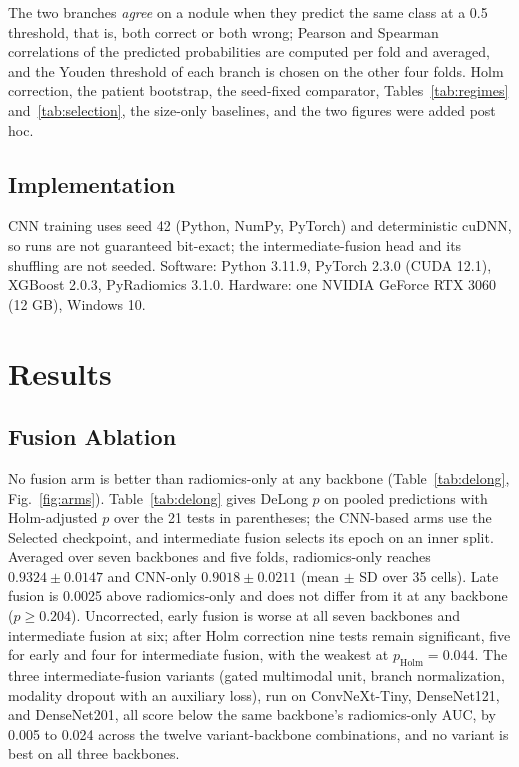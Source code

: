\documentclass[conference]{IEEEtran}
\begin{document}
The two branches \emph{agree} on a nodule when they predict the same class at a 0.5 threshold, that is, both correct or both wrong; Pearson and Spearman correlations of the predicted probabilities are computed per fold and averaged, and the Youden threshold of each branch is chosen on the other four folds. Holm correction, the patient bootstrap, the seed-fixed comparator, Tables~\ref{tab:regimes} and~\ref{tab:selection}, the size-only baselines, and the two figures were added post hoc.

\subsection{Implementation}\label{sec:impl}
CNN training uses seed 42 (Python, NumPy, PyTorch) and deterministic cuDNN, so runs are not guaranteed bit-exact; the intermediate-fusion head and its shuffling are not seeded. Software: Python 3.11.9, PyTorch 2.3.0 (CUDA 12.1), XGBoost 2.0.3, PyRadiomics 3.1.0. Hardware: one NVIDIA GeForce RTX 3060 (12 GB), Windows 10.

\section{Results}\label{sec:results}

\subsection{Fusion Ablation}\label{sec:ablation}
No fusion arm is better than radiomics-only at any backbone (Table~\ref{tab:delong}, Fig.~\ref{fig:arms}). Table~\ref{tab:delong} gives DeLong $p$ on pooled predictions with Holm-adjusted $p$ over the 21 tests in parentheses; the CNN-based arms use the Selected checkpoint, and intermediate fusion selects its epoch on an inner split. Averaged over seven backbones and five folds, radiomics-only reaches $0.9324\pm0.0147$ and CNN-only $0.9018\pm0.0211$ (mean $\pm$ SD over 35 cells). Late fusion is 0.0025 above radiomics-only and does not differ from it at any backbone ($p\geq0.204$). Uncorrected, early fusion is worse at all seven backbones and intermediate fusion at six; after Holm correction nine tests remain significant, five for early and four for intermediate fusion, with the weakest at $p_{\mathrm{Holm}}=0.044$. The three intermediate-fusion variants (gated multimodal unit, branch normalization, modality dropout with an auxiliary loss), run on ConvNeXt-Tiny, DenseNet121, and DenseNet201, all score below the same backbone's radiomics-only AUC, by 0.005 to 0.024 across the twelve variant-backbone combinations, and no variant is best on all three backbones.
\end{document}
